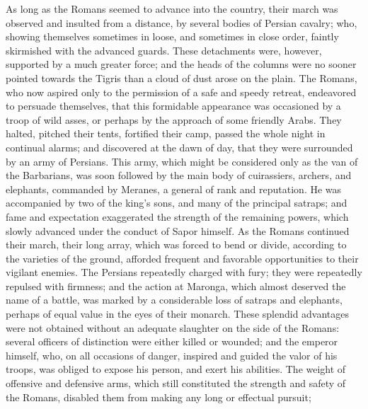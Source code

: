 
As long as the Romans seemed to advance into the country, their
march was observed and insulted from a distance, by several
bodies of Persian cavalry; who, showing themselves sometimes in
loose, and sometimes in close order, faintly skirmished with the
advanced guards. These detachments were, however, supported by a
much greater force; and the heads of the columns were no sooner
pointed towards the Tigris than a cloud of dust arose on the
plain. The Romans, who now aspired only to the permission of a
safe and speedy retreat, endeavored to persuade themselves, that
this formidable appearance was occasioned by a troop of wild
asses, or perhaps by the approach of some friendly Arabs. They
halted, pitched their tents, fortified their camp, passed the
whole night in continual alarms; and discovered at the dawn of
day, that they were surrounded by an army of Persians. This army,
which might be considered only as the van of the Barbarians, was
soon followed by the main body of cuirassiers, archers, and
elephants, commanded by Meranes, a general of rank and
reputation. He was accompanied by two of the king’s sons, and
many of the principal satraps; and fame and expectation
exaggerated the strength of the remaining powers, which slowly
advanced under the conduct of Sapor himself. As the Romans
continued their march, their long array, which was forced to bend
or divide, according to the varieties of the ground, afforded
frequent and favorable opportunities to their vigilant enemies.
The Persians repeatedly charged with fury; they were repeatedly
repulsed with firmness; and the action at Maronga, which almost
deserved the name of a battle, was marked by a considerable loss
of satraps and elephants, perhaps of equal value in the eyes of
their monarch. These splendid advantages were not obtained
without an adequate slaughter on the side of the Romans: several
officers of distinction were either killed or wounded; and the
emperor himself, who, on all occasions of danger, inspired and
guided the valor of his troops, was obliged to expose his person,
and exert his abilities. The weight of offensive and defensive
arms, which still constituted the strength and safety of the
Romans, disabled them from making any long or effectual pursuit;
